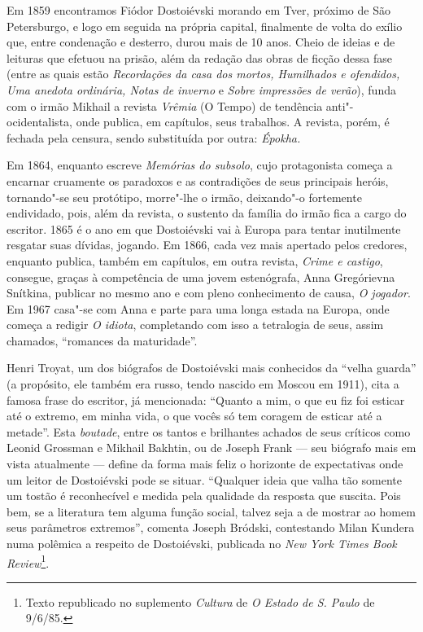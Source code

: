 Em 1859 encontramos Fiódor Dostoiévski morando em Tver, próximo de São
Petersburgo, e logo em seguida na própria capital, finalmente de volta
do exílio que, entre condenação e desterro, durou mais de 10 anos. Cheio
de ideias e de leituras que efetuou na prisão, além da redação das obras
de ficção dessa fase (entre as quais estão \emph{Recordações da casa dos
mortos, Humilhados e ofendidos, Uma anedota ordinária, Notas de
inverno} e \emph{Sobre impressões de verão}), funda com o irmão Mikhail a
revista \emph{Vrêmia} (O Tempo) de tendência anti"-ocidentalista, onde
publica, em capítulos, seus trabalhos. A revista, porém, é fechada pela
censura, sendo substituída por outra: \emph{Épokha.}

Em 1864, enquanto escreve \emph{Memórias do subsolo}, cujo protagonista
começa a encarnar cruamente os paradoxos e as contradições de seus
principais heróis, tornando"-se seu protótipo, morre"-lhe o irmão,
deixando"-o fortemente endividado, pois, além da revista, o sustento da
família do irmão fica a cargo do escritor. 1865 é o ano em que
Dostoiévski vai à Europa para tentar inutilmente resgatar suas dívidas,
jogando. Em 1866, cada vez mais apertado pelos credores, enquanto
publica, também em capítulos, em outra revista, \emph{Crime e
castigo}, consegue, graças à competência de uma jovem estenógrafa, Anna
Gregórievna Snítkina, publicar no mesmo ano e com pleno conhecimento de
causa, \emph{O jogador}. Em 1967 casa"-se com Anna e parte para uma longa
estada na Europa, onde começa a redigir \emph{O idiota}, completando com
isso a tetralogia de seus, assim chamados, ``romances da maturidade''.

Henri Troyat, um dos biógrafos de Dostoiévski mais conhecidos da 
``velha guarda'' (a propósito, ele também era russo, tendo nascido em
Moscou em 1911), cita a famosa frase do escritor, já mencionada:
``Quanto a mim, o que eu fiz foi esticar
até o extremo, em minha vida, o que vocês só tem coragem de esticar até
a metade''. Esta \emph{boutade}, entre os tantos e brilhantes achados
de seus críticos como Leonid Grossman e Mikhail Bakhtin, ou de Joseph
Frank --- seu biógrafo mais em vista atualmente --- define da forma mais feliz o
horizonte de expectativas onde um leitor de Dostoiévski pode se situar.
``Qualquer ideia que valha tão somente um tostão é reconhecível e medida
pela qualidade da resposta que suscita. Pois bem, se a literatura tem
alguma função social, talvez seja a de mostrar ao homem seus parâmetros
extremos'', comenta Joseph Bródski, contestando Milan Kundera numa
polêmica a respeito de Dostoiévski, publicada no \emph{New York Times
Book Review}\footnote{Texto republicado no suplemento \emph{Cultura} de \emph{O
Estado de S. Paulo} de 9/6/85.}.

